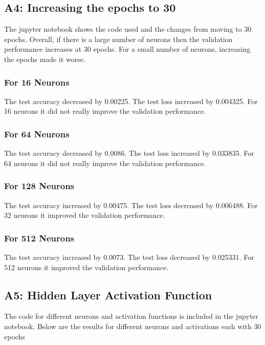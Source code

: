 \documentclass[a4paper, 12pt]{article}
\begin{document}
    \subsection{A4: Increasing the epochs to 30}

    The jupyter notebook shows the code used and the changes from moving to 30 epochs. Overall, if there is a large number of neurons then the validation performance increases at 30 epochs. For a small number of neurons, increasing the epochs made it worse.


    \subsubsection{For 16 Neurons}
    
    The test accuracy decreased by 0.00225. The test loss increased by 0.004325. For 16 neurons it did not really improve the validation performance.

    \subsubsection{For 64 Neurons}

    The test accuracy decreased by 0.0086. The test loss increased by 0.033835. For 64 neurons it did not really improve the validation performance.

    \subsubsection{For 128 Neurons}

    The test accuracy increased by 0.00475. The test loss decreased by 0.006488. For 32 neurons it improved the validation performance.

    \subsubsection{For 512 Neurons}

    The test accuracy increased by 0.0073. The test loss decreased by 0.025331. For 512 neurons it improved the validation performance.

    \subsection{A5: Hidden Layer Activation Function}

    The code for different neurons and activation functions is included in the jupyter notebook. Below are the results for different neurons and activations each with 30 epochs
\end{document}
